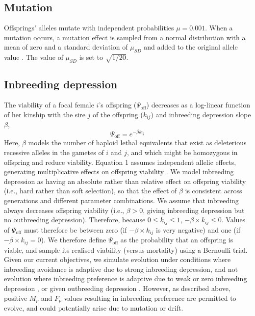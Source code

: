 \documentclass[10pt,letterpaper]{article}
\begin{document}
\subsection*{Mutation}

Offsprings' alleles mutate with independent probabilities $\mu=0.001$. When a mutation occurs, a mutation effect is sampled from a normal distribution with a mean of zero and a standard deviation of $\mu_{SD}$ and added to the original allele value \cite[][]{Kimura1965, Lande1976, Bocedi2014, Duthie}. The value of $\mu_{SD}$ is set to $\sqrt{1/20}$.

\subsection*{Inbreeding depression}

The viability of a focal female $i$'s offspring ($\Psi_{\textrm{off}}$) decreases as a log-linear function of her kinship with the sire $j$ of the offspring ($k_{ij}$) and inbreeding depression slope $\beta$,
\begin{equation}
\Psi_{\textrm{off}} = e^{-\beta k_{ij}}
\end{equation}
Here, $\beta$ models the number of haploid lethal equivalents that exist as deleterious recessive alleles in the gametes of $i$ and $j$, and which might be homozygous in offspring and reduce viability. Equation 1 assumes independent allelic effects, generating multiplicative effects on offspring viability \cite[][]{Morton1956, Mills1994}. We model inbreeding depression as having an absolute rather than relative effect on offspring viability (i.e., hard rather than soft selection), so that the effect of $\beta$ is consistent across generations and different parameter combinations. We assume that inbreeding always decreases offspring viability (i.e., $\beta > 0$, giving inbreeding depression but no outbreeding depression). Therefore, because $0 \leq k_{ij} \leq 1$, $-\beta \times k_{ij} \leq 0$. Values of $\Psi_{\textrm{off}}$ must therefore be between zero (if $-\beta \times k_{ij}$ is very negative) and one (if $-\beta \times k_{ij} = 0$). We therefore define $\Psi_{\textrm{off}}$ as the probability that an offspring is viable, and sample its realised viability (versus mortality) using a Bernoulli trial. Given our current objectives, we simulate evolution under conditions where inbreeding avoidance is adaptive due to strong inbreeding depression, and not evolution where inbreeding preference is adaptive due to weak or zero inbreeding depression \cite[][]{Parker1979, Kokko2006, Duthie2016a}, or given outbreeding depression \cite[][]{Bateson1983, Greeff2009}. However, as described above, positive $M_{p}$ and $F_{p}$ values resulting in inbreeding preference are permitted to evolve, and could potentially arise due to mutation or drift.
\end{document}
